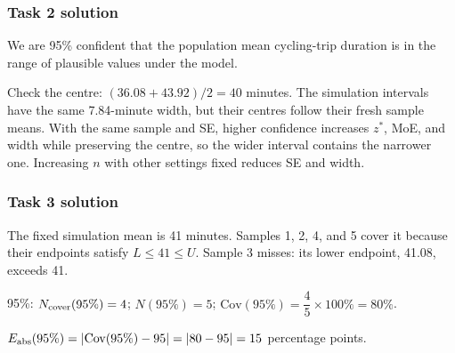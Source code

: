\subsubsection*{Task 2 solution}
\par\smallskip
{}
We are 95\% confident that the population mean cycling-trip duration is in the range of plausible values under the model.

Check the centre: $(36.08+43.92)/2=40$ minutes. The simulation intervals have the same 7.84-minute width, but their centres follow their fresh sample means. With the same sample and SE, higher confidence increases $z^*$, MoE, and width while preserving the centre, so the wider interval contains the narrower one. Increasing $n$ with other settings fixed reduces SE and width.

\subsubsection*{Task 3 solution}
The fixed simulation mean is 41 minutes. Samples 1, 2, 4, and 5 cover it because their endpoints satisfy $L\leq41\leq U$. Sample 3 misses: its lower endpoint, 41.08, exceeds 41.
\par 95\%: $N_{\rm cover}(95\%)=4$; $N(95\%)=5$; $\mathrm{Cov}(95\%)=\dfrac45\times100\%=80\%$.
\par $E_{\rm abs}(95\%)=|\mathrm{Cov}(95\%)-95|=|80-95|=15$ percentage points.

